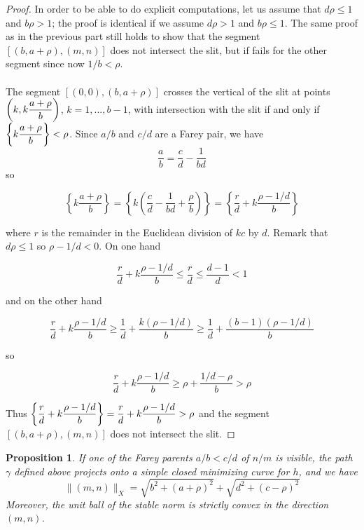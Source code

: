 \documentclass{article}
\newcommand{\St}[1]{\|#1\|_X}
\newtheorem{prop}[thm]{Proposition}
\theoremstyle{definition}
\begin{document}
\begin{proof}
	In order to be able to do explicit computations, let us assume that $d\rho \le 1$ and $b\rho  >1$; the proof is identical if we assume $d\rho  > 1$ and $b\rho\le 1$. The same proof as in the previous part still holds to show that the segment $[(b,a+\rho),(m,n)]$ does not intersect the slit, but if fails for the other segment since now $1/b < \rho$.
	\\ \\
	The segment $[(0,0), (b,a+\rho)]$ crosses the vertical of the slit at points $\left(k,k\mathlarger{\frac{a+\rho}{b}}\right)$, $k=1,...,b-1$, with intersection with the slit if and only if $\left \{ k\mathlarger{\frac{a+\rho}{b}} \right \} < \rho$. Since $a/b$ and $c/d$ are a Farey pair, we have 
	$$ \frac{a}{b} = \frac{c}{d} - \frac{1}{bd} $$
	so
	
	$$\left \{ k \frac{a+\rho}{b} \right \} =  \left \{ k \left(\frac{c}{d}-\frac{1}{bd} + \frac{\rho}{b} \right)\right \}=\left \{ \frac{r}{d}+k\frac{\rho-1/d}{b} \right \}$$
	
	where $r$ is the remainder in the Euclidean division of $kc$ by $d$. Remark that $d\rho\le 1 $ so $\rho - 1/d <0$. On one hand
	
	$$\frac{r}{d}+k\frac{\rho-1/d}{b} \le \frac{r}{d} \le \frac{d-1}{d} < 1$$ 
	
	and on the other hand
	
	$$\frac{r}{d}+k\frac{\rho-1/d}{b} \ge \frac{1}{d} + \frac{k(\rho-1/d)}{b} \ge \frac{1}{d} + \frac{(b-1)(\rho-1/d)}{b}$$
	
	so 
	
	$$\frac{r}{d}+k\frac{\rho-1/d}{b} \ge \rho + \frac{1/d - \rho}{b}> \rho$$
	
	Thus $\mathlarger{\left \{ \frac{r}{d}+k\frac{\rho-1/d}{b} \right \} = \frac{r}{d}+k\frac{\rho-1/d}{b}} > \rho$ and the segment $[(b,a+\rho),(m,n)]$ does not intersect the slit.
	
\end{proof}

\begin{prop}\label{1 parent}
	If one of the Farey parents $a/b<c/d$ of $n/m$ is visible, the path $\gamma$ defined above projects onto a simple closed minimizing curve for $h$, and we have
	$$\St{(m,n)} = \sqrt{b^2+(a+\rho)^2}+\sqrt{d^2+(c-\rho)^2}$$
	Moreover, the unit ball of the stable norm is strictly convex in the direction $(m,n)$.
\end{prop}
\end{document}
